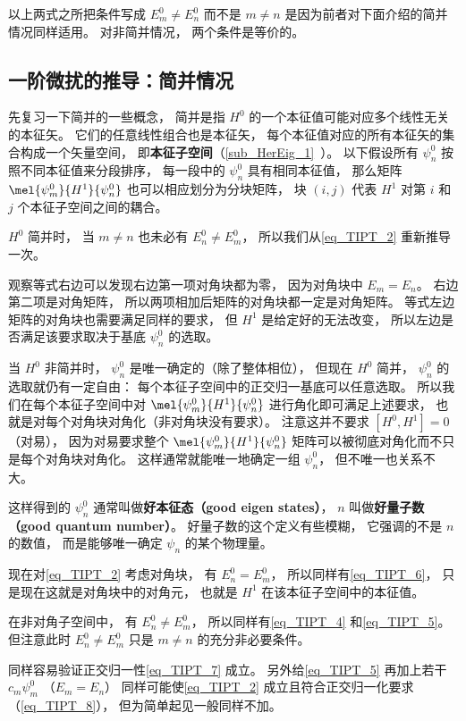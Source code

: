 以上两式之所把条件写成 $E_m^0 \ne E_n^0$ 而不是 $m \ne n$ 是因为前者对下面介绍的简并情况同样适用。 对非简并情况， 两个条件是等价的。

\subsection{一阶微扰的推导：简并情况}
先复习一下简并的一些概念， 简并是指 $H^0$ 的一个本征值可能对应多个线性无关的本征矢。 它们的任意线性组合也是本征矢， 每个本征值对应的所有本征矢的集合构成一个矢量空间， 即\textbf{本征子空间}（\autoref{sub_HerEig_1}~）。 以下假设所有 $\psi_n^0$ 按照不同本征值来分段排序， 每一段中的 $\psi_n^0$ 具有相同本征值， 那么矩阵 $\mel{\psi_m^0}{H^1}{\psi_n^0}$ 也可以相应划分为分块矩阵， 块 $(i,j)$ 代表 $H^1$ 对第 $i$ 和 $j$ 个本征子空间之间的耦合。

$H^0$ 简并时， 当 $m\ne n$ 也未必有 $E_n^0 \ne E_m^0$， 所以我们从\autoref{eq_TIPT_2} 重新推导一次。

观察等式右边可以发现右边第一项对角块都为零， 因为对角块中 $E_m = E_n$。 右边第二项是对角矩阵， 所以两项相加后矩阵的对角块都一定是对角矩阵。 等式左边矩阵的对角块也需要满足同样的要求， 但 $H^1$ 是给定好的无法改变， 所以左边是否满足该要求取决于基底 $\psi_n^0$ 的选取。

当 $H^0$ 非简并时， $\psi_n^0$ 是唯一确定的（除了整体相位）， 但现在 $H^0$ 简并， $\psi_n^0$ 的选取就仍有一定自由： 每个本征子空间中的正交归一基底可以任意选取。 所以我们在每个本征子空间中对 $\mel{\psi_m^0}{H^1}{\psi_n^0}$ 进行角化即可满足上述要求， 也就是对每个对角块对角化（非对角块没有要求）。 注意这并不要求 $[H^0, H^1] = 0$ （对易）， 因为对易要求整个 $\mel{\psi_m^0}{H^1}{\psi_n^0}$ 矩阵可以被彻底对角化而不只是每个对角块对角化。 这样通常就能唯一地确定一组 $\psi_n^0$， 但不唯一也关系不大。

这样得到的 $\psi_n^0$ 通常叫做\textbf{好本征态（good eigen states）}， $n$ 叫做\textbf{好量子数（good quantum number）}。 好量子数的这个定义有些模糊， 它强调的不是 $n$ 的数值， 而是能够唯一确定 $\psi_n$ 的某个物理量。

现在对\autoref{eq_TIPT_2} 考虑对角块， 有 $E_n^0 = E_m^0$， 所以同样有\autoref{eq_TIPT_6}， 只是现在这就是对角块中的对角元， 也就是 $H^1$ 在该本征子空间中的本征值。

在非对角子空间中， 有 $E_n^0 \ne E_m^0$， 所以同样有\autoref{eq_TIPT_4} 和\autoref{eq_TIPT_5}。 但注意此时 $E_n^0 \ne E_m^0$ 只是 $m \ne n$ 的充分非必要条件。

同样容易验证正交归一性\autoref{eq_TIPT_7} 成立。 另外给\autoref{eq_TIPT_5} 再加上若干 $c_m \psi_m^0$ （$E_m = E_n$） 同样可能使\autoref{eq_TIPT_2} 成立且符合正交归一化要求（\autoref{eq_TIPT_8}）， 但为简单起见一般同样不加。
